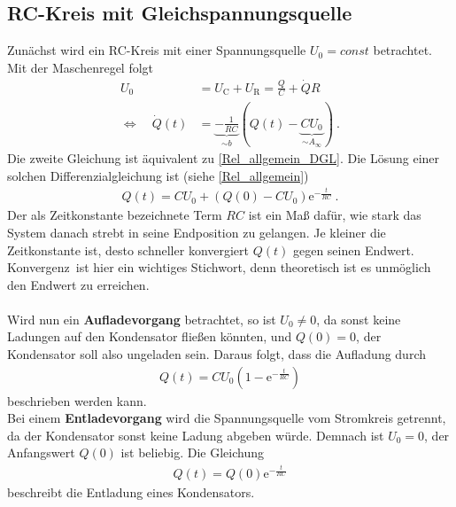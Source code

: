 \subsection{RC-Kreis mit Gleichspannungsquelle \label{sec:Gleichspannung}}
Zunächst wird ein RC-Kreis mit einer Spannungsquelle $U_0 = const$ betrachtet. Mit der Maschenregel folgt
\begin{align}
	U_0 &= U_\text{C} + U_\text{R} = \frac{Q}{C} + \dot{Q}R \\
	\Leftrightarrow\quad \dot{Q}(t) &= \underbrace{-\frac{1}{RC}}_{\sim b}(Q(t) - \underbrace{CU_0}_{\sim A_\infty}) \ .
\end{align}
Die zweite Gleichung ist äquivalent zu \eqref{Rel_allgemein_DGL}. Die Lösung einer solchen Differenzialgleichung ist (siehe \eqref{Rel_allgemein})
\begin{align}
	Q(t) = CU_0 + \left( Q(0) - CU_0 \right)\mathrm{e}^{-\frac{t}{RC}} \ .
\end{align}
Der als Zeitkonstante bezeichnete Term $RC$ ist ein Maß dafür, wie stark das System danach strebt in seine Endposition zu gelangen. Je kleiner die Zeitkonstante ist, desto schneller konvergiert $Q(t)$ gegen seinen Endwert. \glqq Konvergenz\grqq\ ist hier ein wichtiges Stichwort, denn theoretisch ist es unmöglich den Endwert zu erreichen. \\
\ \\
Wird nun ein \textbf{Aufladevorgang} betrachtet, so ist $U_0 \not= 0$, da sonst keine Ladungen auf den Kondensator fließen könnten, und $Q(0) = 0$, der Kondensator soll also ungeladen sein. Daraus folgt, dass die Aufladung durch
\begin{align}\label{Aufladung}
	Q(t) = CU_0 \left( 1 - \mathrm{e}^{-\frac{t}{RC}} \right)
	\label{eq:aufladen}
\end{align}
beschrieben werden kann. \\
Bei einem \textbf{Entladevorgang} wird die Spannungsquelle vom Stromkreis getrennt, da der Kondensator sonst keine Ladung abgeben würde. Demnach ist $U_0 = 0$, der Anfangswert $Q(0)$ ist beliebig. Die Gleichung
\begin{align}
	Q(t) = Q(0)\mathrm{e}^{-\frac{t}{RC}}
\end{align}
beschreibt die Entladung eines Kondensators.


